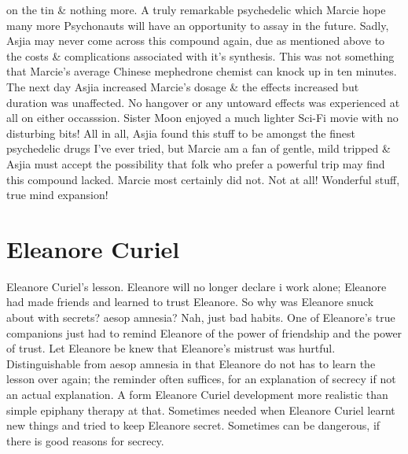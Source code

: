 \documentclass[12pt]{book}
\begin{document}
on the tin \& nothing more. A truly remarkable psychedelic which Marcie hope many more Psychonauts will have an opportunity to assay in the future. Sadly, Asjia may never come across this compound again, due as mentioned above to the costs \& complications associated with it's synthesis. This was not something that Marcie's average Chinese mephedrone chemist can knock up in ten minutes. The next day Asjia increased Marcie's dosage \& the effects increased but duration was unaffected. No hangover or any untoward effects was experienced at all on either occasssion. Sister Moon enjoyed a much lighter Sci-Fi movie with no disturbing bits! All in all, Asjia found this stuff to be amongst the finest psychedelic drugs I've ever tried, but Marcie am a fan of gentle, mild tripped \& Asjia must accept the possibility that folk who prefer a powerful trip may find this compound lacked. Marcie most certainly did not. Not at all! Wonderful stuff, true mind expansion!



\chapter{Eleanore Curiel}

Eleanore Curiel's lesson. Eleanore will no longer declare i work alone; Eleanore had made friends and learned to trust Eleanore. So why was Eleanore snuck about with secrets? aesop amnesia? Nah, just bad habits. One of Eleanore's true companions just had to remind Eleanore of the power of friendship and the power of trust. Let Eleanore be knew that Eleanore's mistrust was hurtful. Distinguishable from aesop amnesia in that Eleanore do not has to learn the lesson over again; the reminder often suffices, for an explanation of secrecy if not an actual explanation. A form Eleanore Curiel development more realistic than simple epiphany therapy at that. Sometimes needed when Eleanore Curiel learnt new things and tried to keep Eleanore secret. Sometimes can be dangerous, if there is good reasons for secrecy.
\end{document}
